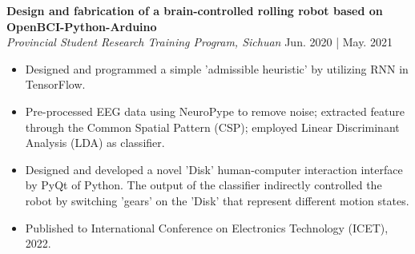 \documentclass[a4paper,9pt]{extarticle}
\begin{document}
\newpage
\noindent
\textbf{Design and fabrication of a brain-controlled rolling robot based on OpenBCI-Python-Arduino} \\ %
\textit{Provincial Student Research Training Program, Sichuan} \hfill Jun. 2020 | May. 2021 %
\begin{itemize}
    \item Designed and programmed a simple 'admissible heuristic' by utilizing RNN in TensorFlow.
    \item Pre-processed EEG data using NeuroPype to remove noise; extracted feature through the Common Spatial Pattern (CSP); employed Linear Discriminant Analysis (LDA) as classifier.
    \item Designed and developed a novel 'Disk' human-computer interaction interface by PyQt of Python. The output of the classifier indirectly controlled the robot by switching 'gears' on the 'Disk' that represent different motion states.
    \item Published to International Conference on Electronics Technology (ICET), 2022.
\end{itemize}
\end{document}
